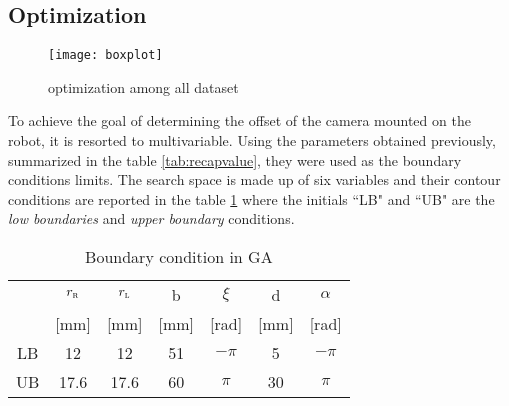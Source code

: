 \subsection{Optimization}
\begin{figure*}[htb]
\centering
\texttt{[image: boxplot]}
\caption{optimization among all dataset}
\label{fig:boxplot}
\end{figure*}
To achieve the goal of determining the offset of the camera mounted on the robot, it is resorted to multivariable.
Using the parameters obtained previously, summarized in the table \ref{tab:recapvalue}, they were used as the boundary conditions limits.
The search space is made up of six variables and their contour conditions are reported in the table \ref{tab:BoundConditionGA} where the initials “LB" and “UB" are the \emph{low boundaries} and \emph{upper boundary} conditions.

\begin{table}[!h]
\centering
\begin{adjustbox}{max width=0.45\textwidth}
\begin{tabular}{ccccccc}
\hline
	&$r_\textsc{r}$ 	& $r_\textsc{l}$	&   b 	& $\xi$	& d 		& $\alpha$\\
	&[mm] 			&    [mm]		& [mm]	&  [rad]		& [mm] 	&  [rad]\\
\hline
LB	&	12  			& 	12  			& 	51 	&	$-\pi$ 	& 	5 	&	$-\pi$\\     
UB 	& 	17.6 		&	17.6 		&	60 	& 	$\pi$ 	&	30	&	$\pi$\\ 
\hline
\end{tabular}
\end{adjustbox}
\caption{Boundary condition in GA}
\label{tab:BoundConditionGA}
\end{table}

